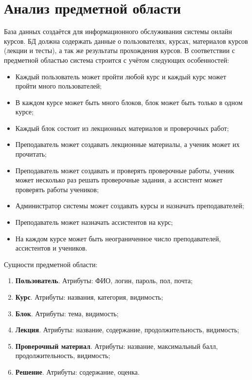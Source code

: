 \documentclass[a4paper,14pt]{article}
\begin{document}

\tableofcontents
\pagebreak

\section{Анализ предметной области}

База данных создаётся для информационного обслуживания системы онлайн курсов.
БД должна содержать данные о пользователях, курсах, материалов курсов (лекции и тесты), а так же результаты прохождения курсов.
В соответствии с предметной областью система строится с учётом следующих особенностей:

\begin{itemize}
	\item Каждый пользователь может пройти любой курс и каждый курс может пройти много пользователей;
	\item В каждом курсе может быть много блоков, блок может быть только в одном курсе;
	\item Каждый блок состоит из лекционных материалов и проверочных работ;
	\item Преподаватель может создавать лекционные материалы, а ученик может их прочитать;
	\item Преподаватель может создавать и проверять проверочные работы, ученик может несколько раз решать проверочные задания, а ассистент может проверять работы учеников;
	\item Администратор системы может создавать курсы и назначать преподавателей;
	\item Преподаватель может назначать ассистентов на курс;
	\item На каждом курсе может быть неограниченное число преподавателей, ассистентов и учеников.	
\end{itemize}

Сущности предметной области:

\begin{enumerate}
	\item \textbf{Пользователь}. Атрибуты: ФИО, логин, пароль, пол, почта;
	\item \textbf{Курс}. Атрибуты: названия, категория, видимость;
	\item \textbf{Блок}. Атрибуты: тема, видимость;
	\item \textbf{Лекция}. Атрибуты: название, содержание, продолжительность, видимость;
	\item \textbf{Проверочный материал}. Атрибуты: название, максимальный балл, продолжительность, видимость;
	\item \textbf{Решение}. Атрибуты: содержание, оценка.
\end{enumerate}
\end{document}
